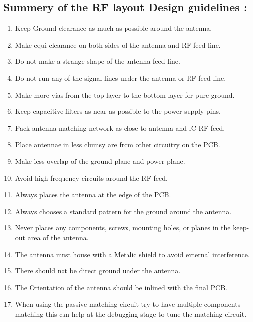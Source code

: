\subsection{Summery of the RF layout Design guidelines :}
\begin{enumerate}
	\item Keep Ground clearance as much as possible around the antenna.
	\item Make equi clearance on both sides of the antenna and RF feed line.
	\item Do not make a strange shape of the antenna feed line.
	\item Do not run any of the signal lines under the antenna or RF feed line.
	\item Make more vias from the top layer to the bottom layer for pure ground.
	\item Keep capacitive filters as near as possible to the power supply pins.
	\item Pack antenna matching network as close to antenna and IC RF feed.
	\item Place antennae in less clumsy are from other circuitry on the PCB.
	\item Make less overlap of the ground plane and power plane.
	\item Avoid high-frequency circuits around the RF feed.
	\item Always places the antenna at the edge of the PCB.
	\item Always chooses a standard pattern for the ground around the antenna.
	\item Never places any components, screws, mounting holes, or planes in the keep-out area of the antenna.
	\item The antenna must house with a Metalic shield to avoid external interference.
	\item There should not be direct ground under the antenna.
	\item The Orientation of the antenna should be inlined with the final PCB.
	\item When using the passive matching circuit try to have multiple components matching this can help at the debugging stage to tune the matching circuit.
\end{enumerate}


